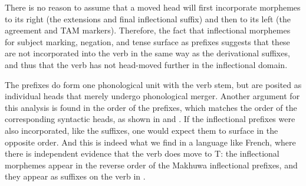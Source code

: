 \documentclass[output=paper
,modfonts
,nonflat]{langsci/langscibook}
\begin{document}
\begin{comment}
\begin{figure}[h!]
\begin{exe}
\ex \forestset{nice empty nodes/.style={for tree={calign=fixed edge angles}, delay={where content={}{shape=coordinate, for current and siblings={anchor=north}}{}}
	},
} 
\begin{forest}
	[AgrSP\footnotemark, nice empty nodes
	[o-] 
	[TP 
	[-h-] 
	[AspP
	[{\lbrack} {\lbrack} {\lbrack} {\lbrack} {\lbrack} -oon{\rbrack} \textsubscript{i}ih{\rbrack}\textsubscript{j}er{\rbrack}\textsubscript{k}iy{\rbrack}\textsubscript{m}a{\rbrack}]
	[vP
	[t]
	[PassP
	[t\textsubscript{m}]
	[ApplP
	[t\textsubscript{k}]
	[CausP
	[t\textsubscript{j}]
	[VP
	[t\textsubscript{i}]
	[epuluutsa
	] ] ] ]	] ] ] ] ]			
\end{forest}
\end{exe}
\end{figure}
\end{comment}

\newpage {}
\newpage There is no reason to assume that a moved head will first incorporate morphemes to its right (the extensions and final inflectional suffix) and then to its left (the agreement and TAM markers). Therefore, the fact that inflectional morphemes for subject marking, negation, and tense surface as prefixes suggests that these are not incorporated into the verb in the same way as the derivational suffixes, and thus that the verb has not head-moved further in the inflectional domain.

The prefixes do form one phonological unit with the verb stem, but are posited as individual heads that merely undergo phonological merger. Another argument for this analysis is found in the order of the prefixes, which matches the order of the corresponding syntactic heads, as shown in  and . If the inflectional prefixes were also incorporated, like the suffixes, one would expect them to surface in the opposite order. And this is indeed what we find in a language like French, where there is independent evidence that the verb does move to T: the inflectional morphemes appear in the reverse order of the Makhuwa inflectional prefixes, and they appear as suffixes on the verb in .

\end{document}
